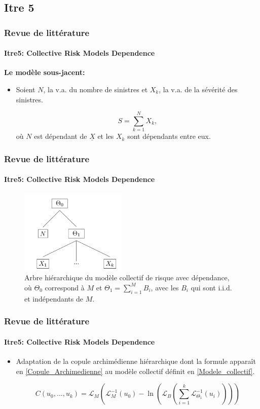 \documentclass[11pt]{beamer}
\begin{document}
\subsection{Itre 5}
\begin{frame}
	\frametitle{Revue de littérature}
	\framesubtitle{Itre5: Collective Risk Models Dependence \cite{Itre5}}

		\textbf{Le modèle sous-jacent:}
		\begin{itemize}
			\item Soient $N$, la v.a. du nombre de sinistres et $X_k$, la v.a. de la sévérité des sinistres.
			
		\begin{equation}\label{Modele_collectif}
			S = \sum_{k=1}^{N} X_k,
		\end{equation}
		où $N$ est dépendant de $\underline{X}$ et les $X_k$ sont dépendants entre eux.
	
		\end{itemize}
\end{frame}


\begin{frame}
	\frametitle{Revue de littérature}
	\framesubtitle{Itre5: Collective Risk Models Dependence \cite{Itre5}}
	
	\begin{figure}[H]
		\centering
		\includegraphics[height=4cm]{Hierarchie}
		\renewcommand{\figurename}{Illustration}
		\caption{Arbre hiérarchique du modèle collectif de risque avec dépendance, où $\Theta_0$ correspond à $M$ et $\Theta_1 = \sum_{i=1}^{M}B_i$, avec les $B_i$ qui sont i.i.d. et indépendants de $M$.}\label{hierarchie_Modele_collectif}
	\end{figure}
	
\end{frame}


\begin{frame}
	\frametitle{Revue de littérature}
	\framesubtitle{Itre5: Collective Risk Models Dependence \cite{Itre5}}
	
	\begin{itemize}
		\item Adaptation de la copule archimédienne hiérarchique dont la formule apparaît en \eqref{Copule_Archimedienne} au modèle collectif définit en \eqref{Modele_collectif}.

		\begin{equation*}
			C(u_0, ..., u_k) = \mathcal{L}_M \left( 
				\mathcal{L}_{M}^{-1} (u_0) - \ln \left(
					\mathcal{L}_B \left(
						\sum_{i=1}^{k} \mathcal{L}_{\Theta_1}^{-1}(u_i)
							\right)\right)\right)
		\end{equation*}
	\end{itemize}
\end{frame}
\end{document}
